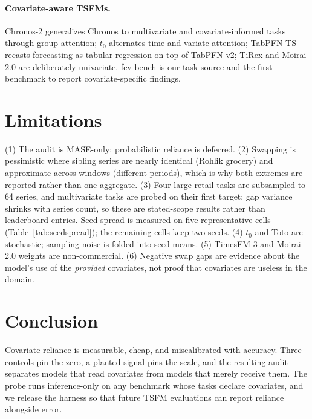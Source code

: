 \documentclass[letterpaper]{article}
\begin{document}
\paragraph{Covariate-aware TSFMs.} Chronos-2 \citep{ansari2025chronos2} generalizes
Chronos \citep{ansari2024chronos} to multivariate and covariate-informed tasks through
group attention; $t_0$ \citep{meyer2026t0} alternates time and variate attention;
TabPFN-TS \citep{hoo2025tabpfn} recasts forecasting as tabular regression on top of
TabPFN-v2; TiRex \citep{auer2025tirex} and Moirai 2.0 \citep{liu2025moirai2} are
deliberately univariate. fev-bench \citep{shchur2025fev} is our task source and the
first benchmark to report covariate-specific findings.

\section{Limitations}
(1) The audit is MASE-only; probabilistic reliance is deferred. (2) Swapping is
pessimistic where sibling series are nearly identical (Rohlik grocery) and approximate
across windows (different periods), which is why both extremes are reported rather
than one aggregate. (3) Four large retail tasks are subsampled to 64 series, and
multivariate tasks are probed on their first target; gap variance shrinks with series
count, so these are stated-scope results rather than leaderboard entries. Seed spread is
measured on five representative cells (Table~\ref{tab:seedspread}); the remaining cells
keep two seeds. (4) $t_0$ and
Toto are stochastic; sampling noise is folded into seed means. (5) TimesFM-3 and
Moirai 2.0 weights are non-commercial. (6) Negative swap gaps are evidence about the
model's use of the \emph{provided} covariates, not proof that covariates are useless
in the domain.

\section{Conclusion}
Covariate reliance is measurable, cheap, and miscalibrated with accuracy. Three
controls pin the zero, a planted signal pins the scale, and the resulting audit
separates models that read covariates from models that merely receive them. The probe
runs inference-only on any benchmark whose tasks declare covariates, and we release
the harness so that future TSFM evaluations can report reliance alongside error.



\end{document}
